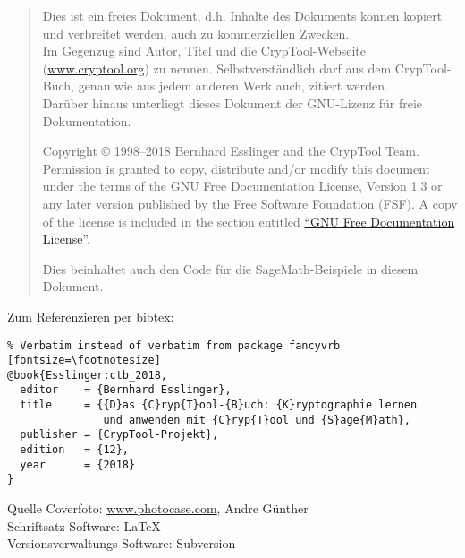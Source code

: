 \begin{quote}
Dies ist ein freies Dokument, d.h. Inhalte des Dokuments können kopiert und
verbreitet werden, auch zu kommerziellen Zwecken.\\
Im Gegenzug sind Autor, Titel und die CrypTool-Webseite (\url{www.cryptool.org}) zu
nennen. Selbstverständlich darf aus dem CrypTool-Buch, genau wie aus jedem
anderen Werk auch, zitiert werden. \\
Darüber hinaus unterliegt dieses Dokument der GNU-Lizenz für freie
Dokumentation.

    Copyright \copyright{} 1998--2018 Bernhard Esslinger and the
    CrypTool Team. Permission is granted to copy,
    distribute and/or modify this document under the terms of the GNU
    Free Documentation License, Version 1.3 or any later version
    published by the Free Software Foundation (FSF). A copy of
    the license is included in the section entitled
    \hyperlink{appendix-GNU-fdl}{``GNU Free Documentation License''}.

    Dies beinhaltet auch den Code für die SageMath-Beispiele in diesem Dokument.
\end{quote}



\vspace{70pt}\noindent Zum Referenzieren per bibtex:
\begin{Verbatim}% Verbatim instead of verbatim from package fancyvrb
[fontsize=\footnotesize]
@book{Esslinger:ctb_2018,
  editor    = {Bernhard Esslinger},
  title     = {{D}as {C}ryp{T}ool-{B}uch: {K}ryptographie lernen
               und anwenden mit {C}ryp{T}ool und {S}age{M}ath},
  publisher = {CrypTool-Projekt},
  edition   = {12},
  year      = {2018}
}
\end{Verbatim}



\vfill

\noindent
Quelle Coverfoto: \url{www.photocase.com}, Andre Günther\\
Schriftsatz-Software: \LaTeX\\
Versionsverwaltungs-Software: Subversion

